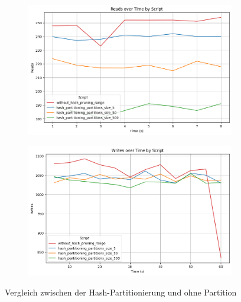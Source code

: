\vspace{-4pt}
\begin{figure}[H]
	\centering
	\begin{subfigure}[t]{0.48\textwidth}
		\includegraphics[width=\textwidth]{PNGs/Script/Partition/hash-partition/Reads}
	\end{subfigure}
	\hfill
	\begin{subfigure}[t]{0.48\textwidth}
		\includegraphics[width=\textwidth]{PNGs/Script/Partition/hash-partition/Writes}
	\end{subfigure}
	\vspace{-9pt}
	\caption[Hash-Partitionierung: Variationen der Partitionsanzahl]{Vergleich zwischen der Hash-Partitionierung und ohne Partition}
	\label{fig:hash-partition}
\end{figure}